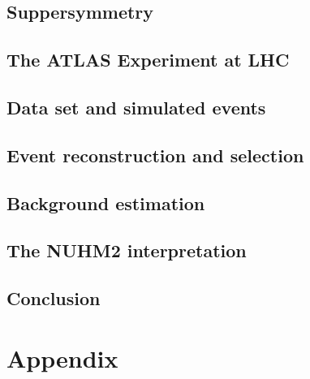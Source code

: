 \documentclass[hyperlinks]{outhesis}
\begin{document}
\chapter{Suppersymmetry}
\label{chapter:Suppersymmetry}
\graphicspath{{figures/susy/}}



\chapter{The ATLAS Experiment at LHC}
\label{chapter:altas_experiment}
\graphicspath{{figures/atlas_experiment/}}



\chapter{Data set and simulated events}
\label{chapter:data}
\graphicspath{{figures/data/}}


\chapter{Event reconstruction and selection}
\label{chapter:event_reconstruction_and_selection}
\graphicspath{{figures/event_reconstruction/}}


\chapter{Background estimation}
\label{chapter:bkg_estimation}
\graphicspath{{figures/bkg_estimation/}}


\chapter{The NUHM2 interpretation}
\label{chapter:results}
\graphicspath{{figures/results/}}


\chapter{Conclusion}
\label{chapter:conclusion}
\graphicspath{{figures/conclusion/}}



\clearpage

\appendix
\part*{Appendix}
\end{document}
